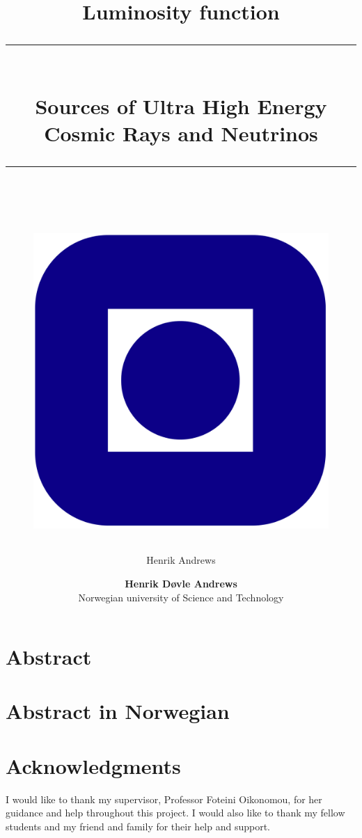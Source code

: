 \documentclass[a4paper, 12pt, openany]{book}
\title{Luminosity function}
\author{Henrik Andrews}
\newcommand{\HRule}[1]{\rule{\linewidth}{#1}}
\begin{document}
\title{ \normalsize
	\HRule{0.5pt} \\
	\LARGE \textbf{{Sources of Ultra High Energy Cosmic Rays and Neutrinos}}	
	\\
	\HRule{2pt} \\ [0.5cm]		
	\vspace{6cm}
	\begin{figure}[htp]
    \centering
    \includegraphics[width=.2\textwidth]{Plots/Logo-Ntnu.svg.png}
    \end{figure}
}

\author{
    \normalsize 
	\textbf{Henrik Døvle Andrews } \\
	Norwegian university of Science and Technology \\ 
}

\maketitle
\setcounter{page}{ 0 }

\newpage




\maketitle

\newpage
{}
\section*{Abstract}
\newpage 
\section*{Abstract in Norwegian}

\newpage



\newpage 
\section*{Acknowledgments}
I would like to thank my supervisor, Professor Foteini Oikonomou, for her guidance and help throughout this project. I would also like to thank my fellow students and my friend and family for their help and support.
\end{document}
